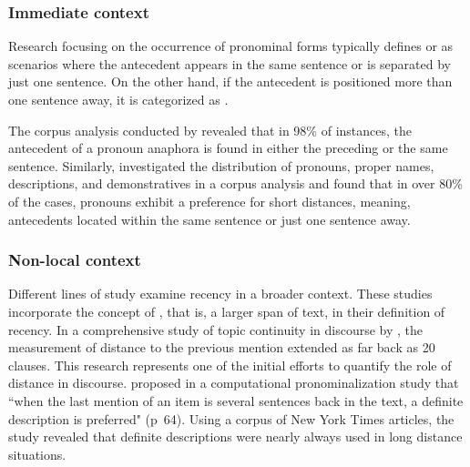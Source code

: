 \subsubsection{Immediate context} 
Research focusing on the occurrence of pronominal forms typically defines  or  as scenarios where the antecedent appears in the same sentence or is separated by just one sentence. On the other hand, if the antecedent is positioned more than one sentence away, it is categorized as  \citep{hobbs1978resolving, ariel1990accessing, Hitzeman1998, poesio2004centering}.

The corpus analysis conducted by \citet{hobbs1978resolving} revealed that in 98\% of instances, the antecedent of a pronoun anaphora is found in either the preceding or the same sentence. Similarly, \citet{ariel1990accessing} investigated the distribution of pronouns, proper names, descriptions, and demonstratives in a corpus analysis and found that in over 80\% of the cases, pronouns exhibit a preference for short distances, meaning, antecedents located within the same sentence or just one sentence away.

\subsubsection{Non-local context} 
Different lines of study examine recency in a broader context. These studies incorporate the concept of , that is, a larger span of text, in their definition of recency. 
In a comprehensive study of topic continuity in discourse by \citet{Givon1983}, the measurement of distance to the previous mention extended as far back as 20 clauses. This research represents one of the initial efforts to quantify the role of distance in discourse.
\citet{mccoy1999generating} proposed in a computational pronominalization study that ``when the last mention of an item is several sentences back in the text, a definite description is preferred" (p~64). Using a corpus of New York Times articles, the study revealed that definite descriptions were nearly always used in long distance situations.


